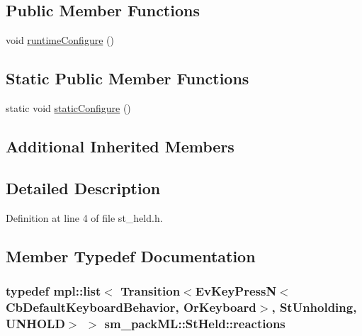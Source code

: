 \subsection*{Public Member Functions}
\begin{DoxyCompactItemize}
\item 
void \hyperlink{structsm__packML_1_1StHeld_a58e225d37891ed694b2bf6da41bc802c}{runtime\+Configure} ()
\end{DoxyCompactItemize}
\subsection*{Static Public Member Functions}
\begin{DoxyCompactItemize}
\item 
static void \hyperlink{structsm__packML_1_1StHeld_a18fcebb225f7c4893932b8b9c3de4276}{static\+Configure} ()
\end{DoxyCompactItemize}
\subsection*{Additional Inherited Members}


\subsection{Detailed Description}


Definition at line 4 of file st\+\_\+held.\+h.



\subsection{Member Typedef Documentation}
\subsubsection[{\texorpdfstring{reactions}{reactions}}]{\setlength{\rightskip}{0pt plus 5cm}typedef mpl\+::list$<$ Transition$<$Ev\+Key\+PressN$<$Cb\+Default\+Keyboard\+Behavior, {\bf Or\+Keyboard}$>$, {\bf St\+Unholding}, {\bf U\+N\+H\+O\+LD}$>$ $>$ {\bf sm\+\_\+pack\+M\+L\+::\+St\+Held\+::reactions}}\hypertarget{structsm__packML_1_1StHeld_acced2f8015ea42707a87101aa52c1621}{}\label{structsm__packML_1_1StHeld_acced2f8015ea42707a87101aa52c1621}


